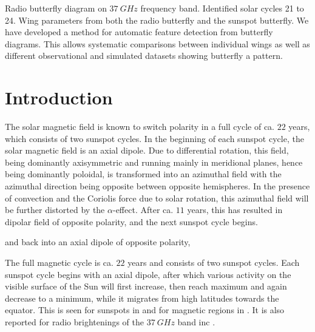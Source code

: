 \documentclass{aa}
\begin{document}
   {Radio butterfly diagram on $\SI{37}{GHz}$ frequency band. Identified solar cycles 21 to 24. Wing parameters from both the radio butterfly and the sunspot butterfly.}
   {We have developed a method for automatic feature detection from butterfly diagrams. This allows systematic comparisons between individual wings as well as different observational and simulated datasets showing butterfly a pattern.}


   \maketitle
%

\section{Introduction}


The solar magnetic field is known to switch polarity in a full cycle of ca. $22$ years, which consists of two sunspot 
cycles. In the beginning of each sunspot cycle, the solar magnetic field is an axial dipole. Due to differential 
rotation, this field, being dominantly axisymmetric and running mainly in meridional planes, hence being dominantly 
poloidal, is transformed into an azimuthal field with the azimuthal direction being opposite between opposite 
hemispheres. In the presence of convection and the Coriolis force due to solar rotation, this azimuthal field will be 
further distorted by the $\alpha$-effect. After ca. $11$ years, this has resulted in dipolar field of opposite polarity, 
and the next sunspot cycle begins.




 and back into an axial dipole of opposite 
polarity,


The full magnetic cycle is ca. $22$ years and consists of two sunspot cycles. Each sunspot cycle begins with 
an axial dipole, after which various activity on the visible surface of the Sun will first increase, 
then reach maximum and again decrease to a minimum, while it migrates from high latitudes towards the equator. This is 
seen for sunspots in \citet{hathaway} and for magnetic regions in \citet{magregion}. It is also reported for radio 
brightenings of the $\SI{37}{GHz}$ band inc \citet{metsahovi40}.
\end{document}
